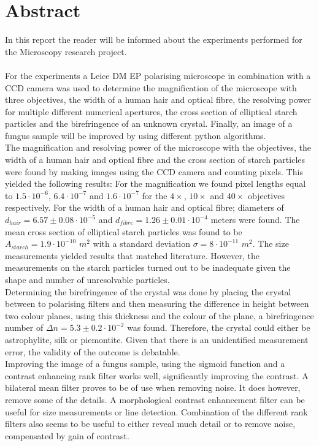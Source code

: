 \section*{Abstract}
In this report the reader will be informed about the experiments performed for the Microscopy research project.\\
\\
For the experiments a Leice DM EP polarising microscope in combination with a CCD camera was used to determine the magnification of the microscope with three objectives, the width of a human hair and optical fibre, the resolving power for multiple different numerical apertures, the cross section of elliptical starch particles and the birefringence of an unknown crystal. Finally, an image of a fungus sample will be improved by using different python algorithms.\\
The magnification and resolving power of the microscope with the objectives, the width of a human hair and optical fibre and the cross section of starch particles were found by making images using the CCD camera and counting pixels. This yielded the following results: For the magnification we found pixel lengths equal to $1.5\cdot10^{-6}$, $6.4\cdot10^{-7}$ and $1.6\cdot10^{-7}$ for the $4\times$, $10\times$ and $40\times$ objectives respectively. For the width of a human hair and optical fibre; diameters of $d_{hair}=6.57\pm0.08\cdot10^{-5}$ and $d_{fibre} = 1.26\pm0.01\cdot10^{-4}$ meters were found. The mean cross section of elliptical starch particles was found to be $A_{starch}=1.9\cdot10^{-10}$ $m^2$ with a standard deviation $\sigma = 8 \cdot10^{-11}$ $m^2$. The size measurements yielded results that matched literature. However, the measurements on the starch particles turned out to be inadequate given the shape and number of unresolvable particles.\\
Determining the birefringence of the crystal was done by placing the crystal between to polarising filters and then measuring the difference in height between two colour planes, using this thickness and the colour of the plane, a birefringence number of $\Delta n = 5.3\pm0.2\cdot10^{-2}$ was found. Therefore, the crystal could either be astrophylite, silk or piemontite. Given that there is an unidentified measurement error, the validity of the outcome is debatable.\\
Improving the image of a fungus sample, using the sigmoid function and a contrast enhancing rank filter works well, significantly improving the contrast. A bilateral mean filter proves to be of use when removing noise. It does however, remove some of the details. A morphological contrast enhancement filter can be useful for size measurements or line detection. Combination of the different rank filters also seems to be useful to either reveal much detail or to remove noise, compensated by gain of contrast.

